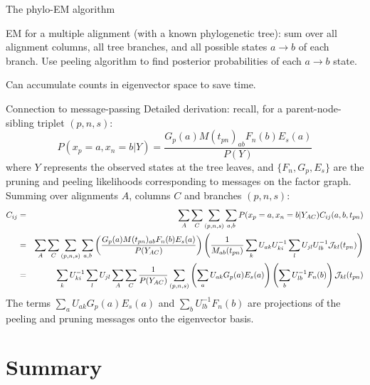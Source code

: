 \documentclass{beamer}
\begin{document}
\begin{frame}{The phylo-EM algorithm}
 \itemb
\item EM for a multiple alignment (with a known phylogenetic tree):
sum over all alignment columns, all tree branches, and all possible states $a \to b$ of each branch.
Use peeling algorithm to find posterior probabilities of each $a \to b$ state.
 \itemb
  \item Can accumulate counts in eigenvector space to save time.
\iteme
\iteme
\end{frame}

\begin{frame}{Connection to message-passing}
\small
Detailed derivation: recall, for a parent-node-sibling triplet $(p,n,s)$:
\[
P(x_p=a,x_n=b|Y) = \frac{G_p(a) M(t_{pn})_{ab} F_n(b) E_s(a)}{P(Y)}
\]
where $Y$ represents the observed states at the tree leaves,
and $\{F_n,G_p,E_s\}$ are the pruning and peeling likelihoods corresponding to messages on the factor graph. \\
Summing over alignments $A$, columns $C$ and branches $(p,n,s)$:
\tiny
\begin{eqnarray*}
C_{ij} & = & \sum_A \sum_C \sum_{(p,n,s)} \sum_{a,b} P(x_p=a,x_n=b|Y_{AC}) C_{ij}(a,b,t_{pn}) \\
& = & \sum_A \sum_C \sum_{(p,n,s)} \sum_{a,b}
\left( \frac{G_p(a) M(t_{pn})_{ab} F_n(b) E_s(a)}{P(Y_{AC})} \right)
\left( \frac{1}{M_{ab}(t_{pn})} \sum_k U_{ak} U^{-1}_{ki} \sum_l U_{jl} U^{-1}_{lb} {\cal J}_{kl}(t_{pn}) \right) \\
& = & \sum_k U^{-1}_{ki} \sum_l U_{jl}
\sum_A \sum_C \frac{1}{P(Y_{AC})} \sum_{(p,n,s)}
\left( \sum_a U_{ak} G_p(a) E_s(a) \right)
\left( \sum_b U^{-1}_{lb} F_n(b) \right)
{\cal J}_{kl}(t_{pn})
\end{eqnarray*}
The terms $\sum_a U_{ak} G_p(a) E_s(a)$ and $\sum_b U^{-1}_{lb} F_n(b)$ are projections of the peeling and pruning messages onto the eigenvector basis.

\end{frame}


\section*{Summary}
\end{document}

